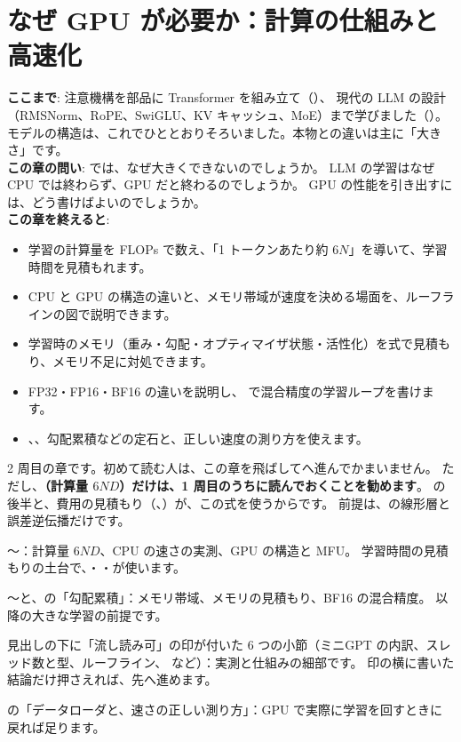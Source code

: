 \chapter{なぜ GPU が必要か：計算の仕組みと高速化}\label{ch:gpu}

\begin{chapterlead}
\textbf{ここまで}: 注意機構を部品に Transformer を組み立て（）、
現代の LLM の設計（RMSNorm、RoPE、SwiGLU、KV キャッシュ、MoE）まで学びました（）。
モデルの構造は、これでひととおりそろいました。本物との違いは主に「大きさ」です。\\[1mm]
\textbf{この章の問い}: では、なぜ大きくできないのでしょうか。
LLM の学習はなぜ CPU では終わらず、GPU だと終わるのでしょうか。
GPU の性能を引き出すには、どう書けばよいのでしょうか。\\[1mm]
\textbf{この章を終えると}:
\begin{itemize}
\item 学習の計算量を FLOPs で数え、「1 トークンあたり約 $6N$」を導いて、学習時間を見積もれます。
\item CPU と GPU の構造の違いと、メモリ帯域が速度を決める場面を、ルーフラインの図で説明できます。
\item 学習時のメモリ（重み・勾配・オプティマイザ状態・活性化）を式で見積もり、メモリ不足に対処できます。
\item FP32・FP16・BF16 の違いを説明し、 で混合精度の学習ループを書けます。
\item {}、、勾配累積などの定石と、正しい速度の測り方を使えます。
\end{itemize}
\end{chapterlead}

\begin{readingguide}
\item[\rgpre] 2 周目の章です。初めて読む人は、この章を飛ばしてへ進んでかまいません。
ただし、\textbf{（計算量 $6ND$）だけは、1 周目のうちに読んでおくことを勧めます}。
の後半と、費用の見積もり（、）が、この式を使うからです。
前提は、の線形層と誤差逆伝播だけです。
\item[\rgmust] 〜：計算量 $6ND$、CPU の速さの実測、GPU の構造と MFU。
学習時間の見積もりの土台で、・・が使います。
\item[\rgmust] 〜と、の「勾配累積」：メモリ帯域、メモリの見積もり、BF16 の混合精度。
以降の大きな学習の前提です。
\item[\rgskim] 見出しの下に「流し読み可」の印が付いた 6 つの小節（ミニGPT の内訳、スレッド数と型、ルーフライン、 など）：実測と仕組みの細部です。
印の横に書いた結論だけ押さえれば、先へ進めます。
\item[\rglater] の「データローダと、速さの正しい測り方」：GPU で実際に学習を回すときに戻れば足ります。
\end{readingguide}

